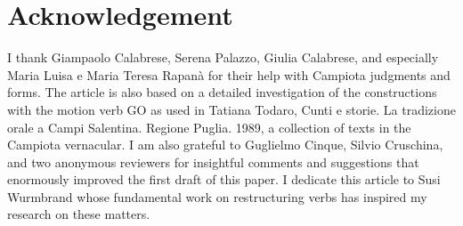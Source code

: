 \documentclass[output=paper]{langscibook}
\begin{document}
\section*{Acknowledgement}

I thank Giampaolo Calabrese, Serena Palazzo, Giulia Calabrese, and especially Maria Luisa e Maria Teresa Rapanà for their help with Campiota judgments and forms. The article is also based on a detailed investigation of the constructions with the motion verb GO as used in Tatiana Todaro, Cunti e storie. La tradizione orale a Campi Salentina. Regione Puglia. 1989, a collection of texts in the Campiota vernacular. I am also grateful to Guglielmo Cinque, Silvio Cruschina, and two anonymous reviewers for insightful comments and suggestions that enormously improved the first draft of this paper. I dedicate this article to Susi Wurmbrand whose fundamental work on restructuring verbs has inspired my research on these matters.

{\sloppy
    \printbibliography[heading=subbibliography,notkeyword=this]
}
\end{document}
